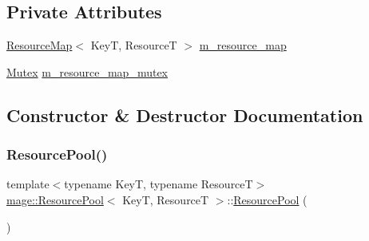 \subsection*{Private Attributes}
\begin{DoxyCompactItemize}
\item 
\hyperlink{namespacemage_a0b0a087ad59dd4aa0b4b538d8caec216}{Resource\+Map}$<$ KeyT, ResourceT $>$ \hyperlink{classmage_1_1_resource_pool_aecc46ecca2a54ef2816137276b1d73cd}{m\+\_\+resource\+\_\+map}
\item 
\hyperlink{structmage_1_1_mutex}{Mutex} \hyperlink{classmage_1_1_resource_pool_a5857b70ac755db750dcaff5277201f9f}{m\+\_\+resource\+\_\+map\+\_\+mutex}
\end{DoxyCompactItemize}


\subsection{Constructor \& Destructor Documentation}
\hypertarget{classmage_1_1_resource_pool_a94aff142869744ed48fb1b426face48b}{}\label{classmage_1_1_resource_pool_a94aff142869744ed48fb1b426face48b} 
\subsubsection{\texorpdfstring{Resource\+Pool()}{ResourcePool()}\hspace{0.1cm}{\footnotesize\ttfamily [1/3]}}
{\footnotesize\ttfamily template$<$typename KeyT, typename ResourceT$>$ \\
\hyperlink{classmage_1_1_resource_pool}{mage\+::\+Resource\+Pool}$<$ KeyT, ResourceT $>$\+::\hyperlink{classmage_1_1_resource_pool}{Resource\+Pool} (\begin{DoxyParamCaption}{ }\end{DoxyParamCaption})\hspace{0.3cm}{\ttfamily [default]}}

\hypertarget{classmage_1_1_resource_pool_a82253c9c4adfc120a813dfe811dd5e91}{}\label{classmage_1_1_resource_pool_a82253c9c4adfc120a813dfe811dd5e91} 
